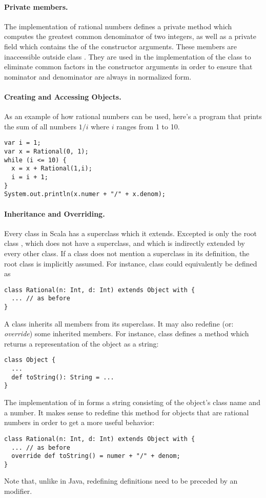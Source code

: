 \documentclass[11pt]{report}
\begin{document}
\paragraph{Private members.}
The implementation of rational numbers defines a private method
\verb@gcd@ which computes the greatest common denominator of two
integers, as well as a private field \verb@g@ which contains the
\verb@gcd@ of the constructor arguments. These members are inaccessible
outside class \verb@Rational@. They are used in the implementation of
the class to eliminate common factors in the constructor arguments in
order to ensure that nominator and denominator are always in
normalized form.

\paragraph{Creating and Accessing Objects.}
As an example of how rational numbers can be used, here's a program
that prints the sum of all numbers $1/i$ where $i$ ranges from 1 to 10.
\begin{verbatim}
var i = 1;
var x = Rational(0, 1);
while (i <= 10) {
  x = x + Rational(1,i);
  i = i + 1;
}
System.out.println(x.numer + "/" + x.denom);
\end{verbatim}

\paragraph{Inheritance and Overriding.}
Every class in Scala has a superclass which it extends.
Excepted is only the root class \verb@Object@, which does not have a
superclass, and which is indirectly extended by every other class.
If a class does not mention a superclass in its definition, the root
class \verb@Object@ is implicitly assumed. For instance, class
\verb@Rational@ could equivalently be defined as
\begin{verbatim}
class Rational(n: Int, d: Int) extends Object with {
  ... // as before
}
\end{verbatim}
A class inherits all members from its superclass. It may also redefine
(or: {\em override}) some inherited members. For instance, class
\verb@Object@ defines
a method
\verb@toString@ which returns a representation of the object as a string:
\begin{verbatim}
class Object {
  ...
  def toString(): String = ...
}
\end{verbatim}
The implementation of \verb@toString@ in \verb@Object@
forms a string consisting of the object's class name and a number. It
makes sense to redefine this method for objects that are rational
numbers in order to get a more useful behavior:
\begin{verbatim}
class Rational(n: Int, d: Int) extends Object with {
  ... // as before
  override def toString() = numer + "/" + denom;
}
\end{verbatim}
Note that, unlike in Java, redefining definitions need to be preceded
by an \verb@override@ modifier.
\end{document}
